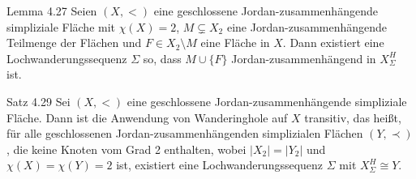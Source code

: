 \documentclass{beamer}
\begin{document}
\begin{frame}
\begin{block}{Lemma 4.27}
 Seien $(X,<)$ eine geschlossene Jordan-zusammenhängende simpliziale Fläche mit $\chi(X)=2$, $M \subsetneq X_2$ eine Jordan-zusammenhängende Teilmenge der Flächen und $F \in X_2\setminus M$ eine Fläche in $X$. Dann existiert eine Lochwanderungssequenz $\Sigma$ so, dass $M \cup \{F\}$ Jordan-zusammenhängend in $X^H_{\Sigma}$ ist.

\end{block}

\end{frame}
\begin{frame}
\begin{block}{Satz 4.29}
Sei $(X,<)$ eine geschlossene Jordan-zusammenhängende simpliziale Fläche. Dann ist die Anwendung von Wanderinghole auf $X$ transitiv, das heißt, für alle geschlossenen Jordan-zusammenhängenden simplizialen Flächen $(Y,\prec)$, die keine Knoten vom Grad 2 enthalten, wobei $\vert X_2 \vert = \vert Y_2 \vert$ und $\chi(X)=\chi(Y)=2$ ist, existiert eine Lochwanderungssequenz $\Sigma$ mit $X^H_{\Sigma} \cong Y$.
\end{block}
\end{frame}
\end{document}
